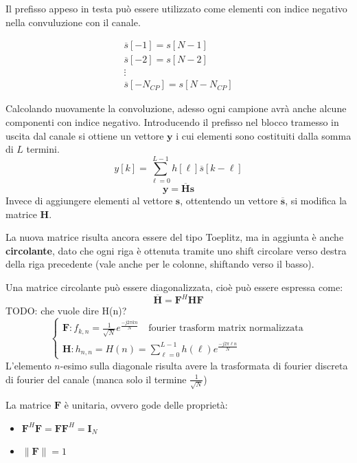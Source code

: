 Il prefisso appeso in testa può essere utilizzato come elementi con indice negativo nella convuluzione con il canale.



\[
    \begin{array}{ll}
        \overline{s}[-1] = s[N - 1] \\
        \overline{s}[-2] = s[N - 2] \\
        \vdots \\
        \overline{s}[-N_{CP}] = s[N - N_{CP}]
    \end{array}
\]



Calcolando nuovamente la convoluzione, adesso ogni campione avrà anche alcune componenti con indice negativo.
Introducendo il prefisso nel blocco tramesso in uscita dal canale si ottiene un vettore $\mathbf{y}$ i cui elementi sono costituiti dalla somma di $L$ termini.
\[
    y[k] = \sum_{\ell=0}^{L-1} h[\ell] \overline{s}[k-\ell]
\]
\[
    \mathbf{y} = \mathbf{\overline{H}} \mathbf{s}
\]
Invece di aggiungere elementi al vettore $\mathbf{s}$, ottentendo un vettore $\mathbf{\overline{s}}$, si modifica la matrice $\mathbf{H}$.

La nuova matrice risulta ancora essere del tipo Toeplitz, ma in aggiunta è anche \textbf{circolante}, dato che ogni riga è ottenuta tramite uno shift circolare verso destra della riga precedente (vale anche per le colonne, shiftando verso il basso).

Una matrice circolante può essere diagonalizzata, cioè può essere espressa come:
\[
    \overline{\mathbf{H}} = \mathbf{F}^H \mathbf{H} \mathbf{F}
\]
TODO: che vuole dire H(n)?
\[
    \begin{cases*}
        \mathbf{F}: f_{k, n} = \frac{1}{\sqrt{N}} e^{\frac{-j2\pi kn}{N}} \quad \text{fourier trasform matrix normalizzata} \\
        \mathbf{H}: h_{n, n} = H(n) = \sum_{\ell=0}^{L-1} h(\ell) e^{\frac{-j2\pi \ell n}{N}} 
    \end{cases*}
\]
L'elemento $n$-esimo sulla diagonale risulta avere la trasformata di fourier discreta di fourier del canale (manca solo il termine $\frac{1}{\sqrt{N}}$)


La matrice $\mathbf{F}$ è unitaria, ovvero gode delle proprietà:
\begin{itemize}
    \item $\mathbf{F}^H \mathbf{F} = \mathbf{F} \mathbf{F}^H = \mathbf{I}_N$
    \item $\| \mathbf{F} \| = 1$ 
\end{itemize}

